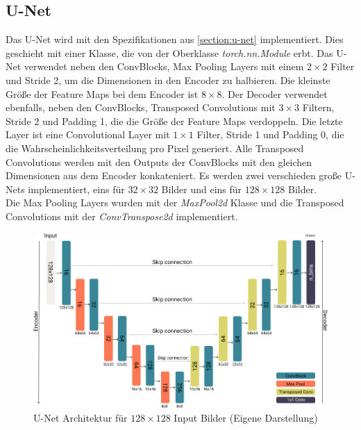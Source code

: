 \subsection{U-Net}
Das U-Net wird mit den Spezifikationen aus \ref{section:u-net} implementiert. Dies geschieht mit einer Klasse, die von der Oberklasse
\textit{torch.nn.Module} erbt. Das U-Net verwendet neben den ConvBlocks, Max Pooling Layers mit einem $2 \times 2$ Filter und Stride 2,
um die Dimensionen in den Encoder zu halbieren. Die kleinste Größe der Feature Maps bei dem Encoder ist $8 \times 8$. 
Der Decoder verwendet ebenfalls, neben den ConvBlocks, Transposed Convolutions mit $3 \times 3$ 
Filtern, Stride 2 und Padding 1, die die Größe der Feature Maps verdoppeln. Die letzte Layer ist eine Convolutional Layer mit $1 \times 1$ Filter, 
Stride 1 und Padding 0, die die
Wahrscheinlichkeitsverteilung pro Pixel generiert. Alle Transposed Convolutions werden mit den Outputs der ConvBlocks mit den gleichen
Dimensionen aus dem Encoder konkateniert. 
Es werden zwei verschieden große U-Nets implementiert, eins für $32 \times 32$ Bilder und eins für 
$128 \times 128$ Bilder.
\\
Die Max Pooling Layers wurden mit der \textit{MaxPool2d} Klasse und die Transposed Convolutions mit der \textit{ConvTranspose2d} implementiert.

\begin{figure}[H]
  \centering
  \includegraphics[width=1\textwidth]{resources/networks/128u-net.png}
  \caption{U-Net Architektur für $128 \times 128$ Input Bilder (Eigene Darstellung)}
  \label{image:128u-net}
\end{figure}